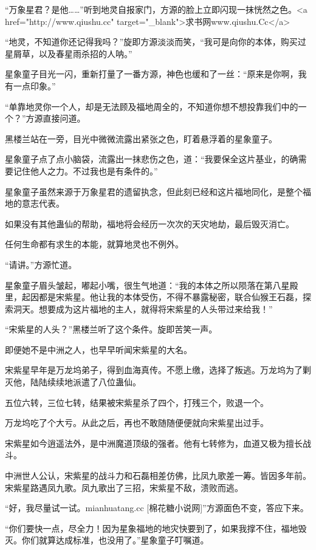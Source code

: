 
\begin{this_body}

“万象星君？是他……”听到地灵自报家门，方源的脸上立即闪现一抹恍然之色。<a href="http://www.qiushu.cc" target="\_blank">求书网www.qiushu.Cc</a>

“地灵，不知道你还记得我吗？”旋即方源淡淡而笑，“我可是向你的本体，购买过星屑草，以及春星雨杀招的人呐。”

星象童子目光一闪，重新打量了一番方源，神色也缓和了一丝：“原来是你啊，我有一点印象。”

“单靠地灵你一个人，却是无法顾及福地周全的，不知道你想不想投靠我们中的一个？”方源直接问道。

黑楼兰站在一旁，目光中微微流露出紧张之色，盯着悬浮着的星象童子。

星象童子点了点小脑袋，流露出一抹悲伤之色，道：“我要保全这片基业，的确需要记住他人之力。不过我也是有条件的。”

星象童子虽然来源于万象星君的遗留执念，但此刻已经和这片福地同化，是整个福地的意志代表。

如果没有其他蛊仙的帮助，福地将会经历一次次的天灾地劫，最后毁灭消亡。

任何生命都有求生的本能，就算地灵也不例外。

“请讲。”方源忙道。

星象童子眉头皱起，嘟起小嘴，很生气地道：“我的本体之所以陨落在第八星殿里，起因都是宋紫星。他让我的本体受伤，不得不暴露秘密，联合仙猴王石磊，探索洞天。想要成为这片福地的主人，就得将宋紫星的人头带过来给我！”

“宋紫星的人头？”黑楼兰听了这个条件。旋即苦笑一声。

即便她不是中洲之人，也早早听闻宋紫星的大名。

宋紫星早年是万龙坞弟子，得到血海真传。不愿上缴，选择了叛逃。万龙坞为了剿灭他，陆陆续续地派遣了八位蛊仙。

五位六转，三位七转，结果被宋紫星杀了四个，打残三个，败退一个。

万龙坞吃了个大亏。从此之后，再也不敢随随便便就向宋紫星出过手。

宋紫星如今逍遥法外，是中洲魔道顶级的强者。他有七转修为，血道又极为擅长战斗。

中洲世人公认，宋紫星的战斗力和石磊相差仿佛，比凤九歌差一筹。皆因多年前。宋紫星路遇凤九歌。凤九歌出了三招，宋紫星不敌，溃败而逃。

“好，我尽量试一试。mianhuatang.cc [棉花糖小说网]”方源面色不变，答应下来。

“你们要快一点，尽全力！因为星象福地的地灾快要到了，如果我撑不住，福地毁灭。你们就算达成标准，也没用了。”星象童子叮嘱道。


\end{this_body}
